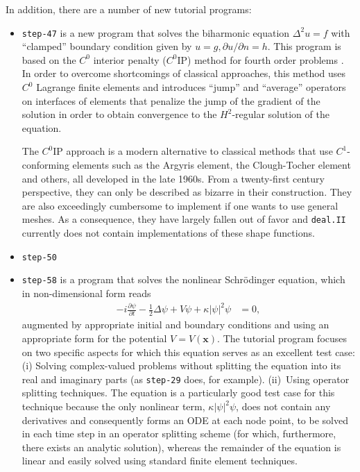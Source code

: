 \documentclass{ansarticle-preprint}
\newcommand{\specialword}[1]{\texttt{#1}}
\newcommand{\dealii}{{\specialword{deal.II}}\xspace}
\begin{document}
In addition, there are a number of new tutorial programs:
\begin{itemize}
\item \texttt{step-47} is a new program that solves the biharmonic
  equation $\Delta^2 u = f$ with
  ``clamped'' boundary condition given by $u=g, \partial u/\partial
  n=h$. This program is based on the $C^0$ interior
  penalty ($C^0$IP) method for fourth order problems
  \cite{Brenner2005}. In order to overcome
  shortcomings of classical approaches, this method uses $C^0$ Lagrange finite
  elements and introduces ``jump'' and ``average'' operators on
  interfaces of elements that penalize the jump of the gradient of the
  solution in order to obtain convergence to the $H^2$-regular
  solution of the equation.

  The $C^0$IP approach is a modern alternative to classical methods that
  use $C^1$-conforming elements such as the Argyris
  element, the Clough-Tocher element and others, all developed in the
  late 1960s. From a twenty-first century perspective, they can only be
  described as bizarre in their construction. They are also exceedingly
  cumbersome to implement if one wants to use general meshes. As a
  consequence, they have largely fallen out of favor and \dealii{} currently
  does not contain implementations of these shape functions.
  
\item \texttt{step-50}

\item \texttt{step-58} is a program that solves the nonlinear
  Schr{\"o}dinger equation, which in non-dimensional form reads
  \begin{align*}
  - i \frac{\partial \psi}{\partial t}
  - \frac 12 \Delta \psi
  + V \psi
  + \kappa |\psi|^2 \psi
  &= 0,
  \end{align*}
  augmented by appropriate initial and boundary conditions and using
  an appropriate form for the potential $V=V(\mathbf x)$. The
  tutorial program focuses on two specific aspects for which this
  equation serves as an excellent test case: (i) Solving
  complex-valued problems without splitting the equation into its
  real and imaginary parts (as \texttt{step-29} does, for
  example). (ii)~Using operator splitting techniques. The equation is
  a particularly good test case for this technique because the only
  nonlinear term, $\kappa |\psi|^2 \psi$, does not contain any
  derivatives and consequently forms an ODE at each node point, to be
  solved in each time 
  step in an operator splitting scheme (for which, furthermore, there
  exists an analytic solution), whereas the remainder of the
  equation is linear and easily solved using standard finite element
  techniques.


\end{itemize}
\end{document}

